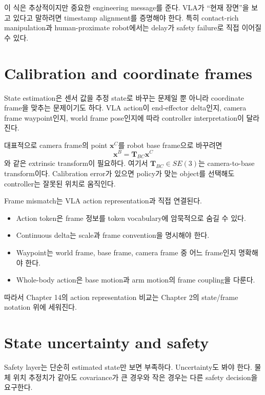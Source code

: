 이 식은 추상적이지만 중요한 engineering message를 준다. VLA가 ``현재 장면''을 보고 있다고 말하려면 timestamp alignment를 증명해야 한다. 특히 contact-rich manipulation과 human-proximate robot에서는 delay가 safety failure로 직접 이어질 수 있다.

\section{Calibration and coordinate frames}

State estimation은 센서 값을 추정 state로 바꾸는 문제일 뿐 아니라 coordinate frame을 맞추는 문제이기도 하다. VLA action이 end-effector delta인지, camera frame waypoint인지, world frame pose인지에 따라 controller interpretation이 달라진다.

대표적으로 camera frame의 point $\bm{x}^{C}$를 robot base frame으로 바꾸려면
\begin{equation}
  \bm{x}^{B} = \bm{T}_{BC}\bm{x}^{C}
  \label{eq:frame-transform}
\end{equation}
와 같은 extrinsic transform이 필요하다. 여기서 $\bm{T}_{BC}\in SE(3)$는 camera-to-base transform이다. Calibration error가 있으면 policy가 맞는 object를 선택해도 controller는 잘못된 위치로 움직인다.

Frame mismatch는 VLA action representation과 직접 연결된다.

\begin{itemize}
  \item Action token은 frame 정보를 token vocabulary에 암묵적으로 숨길 수 있다.
  \item Continuous delta는 scale과 frame convention을 명시해야 한다.
  \item Waypoint는 world frame, base frame, camera frame 중 어느 frame인지 명확해야 한다.
  \item Whole-body action은 base motion과 arm motion의 frame coupling을 다룬다.
\end{itemize}

따라서 Chapter 14의 action representation 비교는 Chapter 2의 state/frame notation 위에 세워진다.

\section{State uncertainty and safety}

Safety layer는 단순히 estimated state만 보면 부족하다. Uncertainty도 봐야 한다. 물체 위치 추정치가 같아도 covariance가 큰 경우와 작은 경우는 다른 safety decision을 요구한다.

